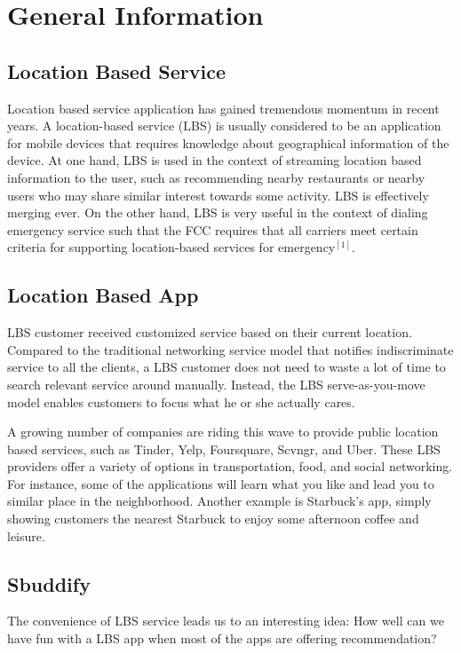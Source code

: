 \documentclass[journal]{IEEEtran}
\begin{document}
\section{General Information}
\subsection{Location Based Service}
Location based service application has gained tremendous momentum in recent years. 
A location-based service (LBS) is usually considered to be an application for mobile devices that requires knowledge about geographical information of the device. At one hand, LBS is used in the context of streaming location based information to the user, such as recommending nearby restaurants or nearby users who may share similar interest towards some activity. LBS is effectively merging ever. On the other hand,  LBS is very useful in the context of dialing emergency service such that the FCC requires that all carriers meet certain criteria for supporting location-based services for emergency$^{[1]}$.

\subsection{Location Based App}
LBS customer received customized service based on their current location. Compared to the traditional networking service model that notifies indiscriminate service to all the clients, a LBS customer does not need to waste a lot of time to search relevant service around manually. Instead, the LBS serve-as-you-move model enables customers to focus what he or she actually cares.

A growing number of companies are riding this wave to provide public location based services, such as Tinder, Yelp, Foursquare, Scvngr, and Uber. These LBS providers offer a variety of options in transportation, food, and social networking. For instance, some of the applications will learn what you like and lead you to similar place in the neighborhood. Another example is Starbuck's app, simply showing customers the nearest Starbuck to enjoy some afternoon coffee and leisure. 


\subsection{Sbuddify}
The convenience of LBS service leads us to an interesting idea: How well can we have fun with a LBS app when most of the apps are offering recommendation?
\end{document}
